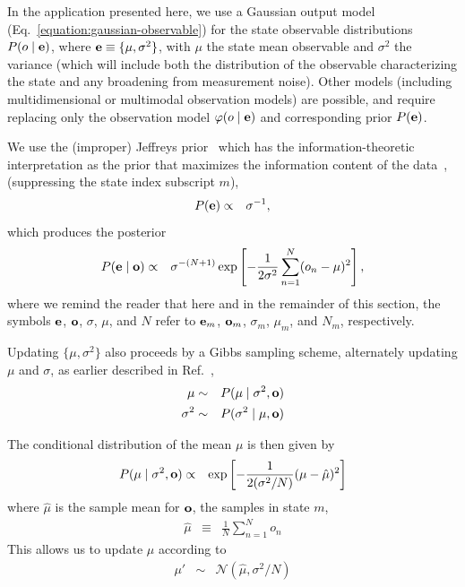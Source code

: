 \documentclass[aps,pre,twocolumn,superscriptaddress,nofootinbib,longbibliography]{revtex4-1}
\newcommand{\bfm}[1]{{\bf #1}}
\begin{document}
{In the application presented here, we use a Gaussian output model (Eq.~\ref{equation:gaussian-observable}) 
for the state observable distributions $P(o \mid \bfm{e})$, where $\bfm{e} \equiv \{\mu, \sigma^2\}$, with $\mu$ the state mean observable and $\sigma^2$ the variance (which will include both the distribution of the observable characterizing the state and any broadening from measurement noise).
Other models (including multidimensional or multimodal observation models) are possible, and require replacing only the observation model $\varphi(o \mid \bfm{e})$ and corresponding prior $P(\bfm{e})$.

We use the (improper) Jeffreys prior~\cite{jeffreys:proc-royal-soc-a:1946:jeffreys-prior} which has the information-theoretic interpretation as the prior that maximizes the information content of the data~\cite{goyal:bayesian-inference-book:2005:jeffreys-prior}, (suppressing the state index subscript $m$),
\begin{eqnarray}
P(\bfm{e}) &\propto& \sigma^{-1} \label{equation:emission-parameter-prior} ,
\end{eqnarray}
which produces the posterior
\begin{eqnarray}
P(\bfm{e} \mid \bfm{o}) &\propto& \sigma^{-(N+1)} \exp\left[-\frac{1}{2 \sigma^2} \sum_{n=1}^N (o_n - \mu)^2 \right] ,
\end{eqnarray}
where we remind the reader that here and in the remainder of this section, the symbols $\bfm{e}$, $\bfm{o}$, $\sigma$, $\mu$, and $N$ refer to $\bfm{e}_m$, $\bfm{o}_m$, $\sigma_m$, $\mu_m$, and $N_m$, respectively.

Updating $\{\mu, \sigma^2\}$ also proceeds by a Gibbs sampling scheme, alternately updating $\mu$ and $\sigma$, as earlier described in Ref.~\citep{chodera-noe:jcp:2011:observable-sampling},
\begin{eqnarray}
\mu &\sim& P(\mu \mid \sigma^2, \bfm{o}) \nonumber \\
\sigma^2 &\sim& P(\sigma^2 \mid \mu, \bfm{o})
\end{eqnarray}

The conditional distribution of the mean $\mu$ is then given by
\begin{eqnarray}
P(\mu \mid \sigma^2, \bfm{o}) &\propto& \exp\left[-\frac{1}{2 (\sigma^2/N)} (\mu - \hat{\mu})^2 \right] 
\end{eqnarray}
where $\hat{\mu}$ is the sample mean for $\bfm{o}$, the samples in state $m$,
\begin{eqnarray}
\hat{\mu} &\equiv& \frac{1}{N} \sum_{n=1}^N o_n
\end{eqnarray}
This allows us to update $\mu$ according to 
\begin{eqnarray}
\mu' &\sim& \mathcal{N}(\hat{\mu}, \sigma^2 / N)
\end{eqnarray}

}
\end{document}
